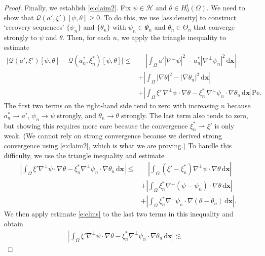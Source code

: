 \documentclass[a4paper, 10pt]{amsart}
\numberwithin{equation}{section}
\theoremstyle{plain}
\theoremstyle{definition}
\theoremstyle{remark}
\newcommand{\cal}[1]{\mathcal{#1}}
\newcommand{\Pe}{\mathrm{Pe}}
\newcommand{\Hoz}{H_0^1(\Omega)}
\newcommand{\QF}{\mathcal{Q}}
\renewcommand{\vec}[1]{\mathbf{#1}}
\newcommand{\weakto}{\rightharpoonup}
\newcommand{\abs}[1]{\left\vert #1 \right\vert}
\newcommand{\dx}{\mathrm{d} \vec{x}}
\newcommand{\avg}[1]{\int_\Omega #1 \,\dx}
\begin{document}
\begin{proof}
Finally, we establish \cref{e:claim2}. Fix $\psi \in \cal{H}$ and $\theta \in \Hoz$. We need to show that $\QF(a', \xi')[\psi, \theta] \geq 0$. To do this, we use \cref{ass:density} to construct `recovery sequences' $\{\psi_n\}$ and $\{\theta_n\}$ with $\psi_n\in \Psi_n$ and $\theta_n \in \Theta_n$ that converge strongly to $\psi$ and $\theta$. Then, for each $n$, we apply the triangle inequality to estimate
\begin{align}\label{e:Q-estimate}
    \Big| \QF(a', \xi')[\psi, \theta] - \QF(a_n^*, \xi_n^*)[\psi, \theta] \Big|
    \leq&
    \phantom{+\;}
    \abs{  \avg{a' |\nabla^{\perp} \psi|^2 
        -  a_n^* |\nabla^{\perp} \psi_n|^2} }
    \\ \nonumber
    &+ \abs{ \avg{ \abs{\nabla \theta}^2 - \abs{\nabla \theta_n}^2}}
    \\ \nonumber
    &+ \abs{ \avg{ \xi' \,\nabla^{\perp} \psi \cdot \nabla \theta
            - \xi^*_n \,\nabla^{\perp} \psi_n \cdot \nabla \theta_n  } } \Pe.
\end{align}
The first two terms on the right-hand side tend to zero with increasing $n$ because $a_n^* \to a'$, $\psi_n \to \psi$ strongly, and $\theta_n \to \theta$ strongly. The last term also tends to zero, but showing this requires more care because the convergence $\xi_n^* \weakto \xi'$ is only weak. (We cannot rely on strong convergence because we derived strong convergence using \cref{e:claim2}, which is what we are proving.) To handle this difficulty, we use the triangle inequality and estimate
\begin{align*}
    \abs{ 
        \avg{ \xi' \nabla^{\perp} \psi \cdot \nabla \theta
        - \xi^*_n \nabla^{\perp} \psi_n \cdot \nabla \theta_n
        }
    }
    \leq & 
    \phantom{+\;}
    \abs{
        \avg{
            (\xi' - \xi_n^*) \nabla^{\perp} \psi \cdot \nabla \theta
        }
    }
    \\
    &+
    \abs{
        \avg{
            \xi^*_n \nabla^{\perp} (\psi - \psi_n) \cdot \nabla \theta
        }
    }
    \\ 
    &+ 
    \abs{
        \avg{
            \xi^*_n \nabla^{\perp}\psi_n \cdot \nabla (\theta - \theta_n)
        }
    }
    .
\end{align*}
We then apply estimate \cref{e:clms} to the last two terms in this inequality and obtain
\begin{align*}
    \abs{ 
        \avg{ \xi' \nabla^{\perp} \psi \cdot \nabla \theta
        - \xi^*_n \nabla^{\perp} \psi_n \cdot \nabla \theta_n
        }
    }
    \lesssim &

\end{align*}
\end{proof}
\end{document}
